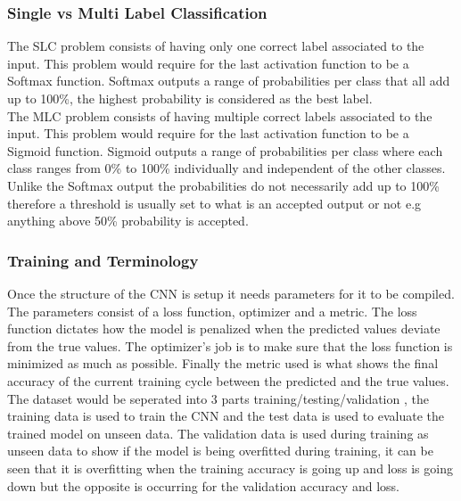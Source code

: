 \documentclass{csfyp}
\newcommand\tab[1][1cm]{\hspace*{#1}}
\begin{document}
\subsubsection{Single vs Multi Label Classification}
The SLC problem consists of having only one correct label associated to the input. This problem would require for the last activation function to be a Softmax function. Softmax outputs a range of probabilities per class that all add up to 100\%, the highest probability is considered as the best label. \\
\tab The MLC problem consists of having multiple correct labels associated to the input. This problem would require for the last activation function to be a Sigmoid function. Sigmoid outputs a range of probabilities per class where each class ranges from 0\% to 100\% individually and independent of the other classes. Unlike the Softmax output the probabilities do not necessarily add up to 100\% therefore a threshold is usually set to what is an accepted output or not e.g anything above 50\% probability is accepted.

\subsubsection{Training and Terminology}
Once the structure of the CNN is setup it needs parameters for it to be compiled. The parameters consist of a \Gls{loss} function, optimizer and a metric. The \Gls{loss} function dictates how the model is penalized when the predicted values deviate from the true values. The optimizer’s job is to make sure that the \Gls{loss} function is minimized as much as possible. Finally the metric used is what shows the final accuracy of the current training cycle between the predicted and the true values. The dataset would be seperated into 3 parts training/testing/validation , the training data is used to train the CNN and the test data is used to evaluate the trained model on unseen data. The validation data is used during training as unseen data to show if the model is being overfitted during training, it can be seen that it is overfitting when the training accuracy is going up and \Gls{loss} is going down but the opposite is occurring for the validation accuracy and \Gls{loss}. 
\end{document}
